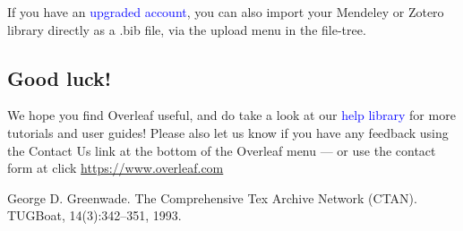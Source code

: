 \documentclass{article}
\begin{document}
If you have an  \textcolor{blue}{upgraded account}, you can also import your Mendeley or Zotero library directly as a .bib file, via the upload menu in the file-tree.
\subsection{Good luck!}
We hope you find Overleaf useful, and do take a look at our \textcolor{blue}{ help library} for more tutorials and user guides! Please also let us know if you have any feedback using the Contact Us link at the bottom of the Overleaf menu — or use the contact form at click  \textcolor{blue}{\url{https://www.overleaf.com}}

\begin{thebibliography}{1}
\bibitem[Gre93] George D. Greenwade. The Comprehensive Tex Archive Network (CTAN). TUGBoat, 14(3):342–351, 1993.
\end{thebibliography}
\end{document}
